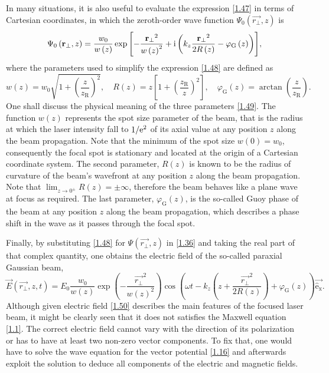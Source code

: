 In many situations, it is also useful to evaluate the expression \ref{1.47} in terms of Cartesian coordinates, in which the zeroth-order wave function $ \Psi_0 \left(\vec{r_\bot}, z \right) $ is
\begin{equation}
\label{1.48}
\Psi_0 \left(\mathbf{r_\bot}, z \right) = \frac{w_0}{w\left(z\right)} \exp{\left[- \frac{\mathbf{r_\bot}^2}{w\left(z \right)^2} + \mathrm{i}\left( k_z \frac{\mathbf{r_\bot}^2}{2 R\left(z \right)} - \varphi_\mathrm{G} \left( z\right) \right) \right]},
\end{equation}
where the parameters used to simplify the expression \ref{1.48} are defined as
\begin{equation}
\label{1.49}
w\left(z\right) = w_0 \sqrt{1 + \left(\frac{z}{z_\mathrm{R}}\right)^2}, \quad R\left(z \right) = z \left[1 + \left(\frac{z_\mathrm{R}}{z} \right)^2\right], \quad \varphi_\mathrm{G}\left(z\right) = \arctan{\left(\frac{z}{z_\mathrm{R}}\right)}.
\end{equation}
One shall discuss the physical meaning of the three parameters \ref{1.49}. The function $ w\left(z\right) $ represents the spot size parameter of the beam, that is the radius at which the laser intensity fall to $ 1/\mathrm{e}^2 $ of its axial value at any position $ z $ along the beam propagation. Note that the minimum of the spot size $ w(0) = w_0 $, consequently the focal spot is stationary and located at the origin of a Cartesian coordinate system. The second parameter, $ R\left(z \right) $ is known to be the radius of curvature of the beam's wavefront at any position $ z $ along the beam propagation. Note that $ \lim_{z \to 0^{\pm}} R(z) = \pm \infty $, therefore the beam behaves like a plane wave at focus as required. The last parameter, $ \varphi_\mathrm{G}\left(z\right) $, is the so-called Guoy phase of the beam at any position $ z $ along the beam propagation, which describes a phase shift in the wave as it passes through the focal spot.

Finally, by substituting \ref{1.48} for $ \Psi \left(\vec{r_\bot}, z \right) $ in \ref{1.36} and taking the real part of that complex quantity, one obtains the electric field of the so-called paraxial Gaussian beam,
\begin{equation}
\label{1.50}
\vec{E}\left(\vec{r_\bot}, z, t \right) = E_0 \frac{w_0}{w(z)} \exp\left(-\frac{\vec{r_\bot}^2}{w(z)^2}\right) \cos\left(\omega t - k_z \left(z + \frac{\vec{r_\bot}^2}{2 R(z)} \right) + \varphi_\mathrm{G}\left(z\right) \right) \mathrm{\vec{\hat{e}_x}}.
\end{equation}
Although given electric field \ref{1.50} describes the main features of the focused laser beam, it might be clearly seen that it does not satisfies the Maxwell equation \ref{1.1}. The correct electric field cannot vary with the direction of its polarization or has to have at least two non-zero vector components. To fix that, one would have to solve the wave equation for the vector potential \ref{1.16} and afterwards exploit the solution to deduce all components of the electric and magnetic fields.   

